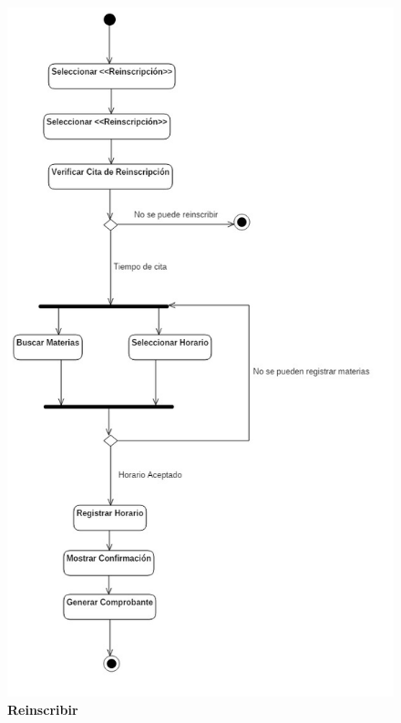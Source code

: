 \begin{figure}[H]
  \centering
    \includegraphics[scale=.65,angle=0]{project/Actividades/reinscripcion.jpg}
  \caption{\textbf{Reinscribir}}
\end{figure}
